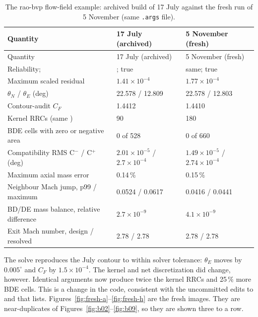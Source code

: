 {\footnotesize
\begin{longtable}{P{6.4cm}P{4.4cm}P{4.4cm}}
\caption{The rao-bvp flow-field example: archived build of 17 July against the fresh run of 5 November (same \texttt{.args} file).}\label{tab:fresh-compare}\\
\toprule
Quantity & 17 July (archived) & 5 November (fresh)\\
\midrule
\endfirsthead
\toprule
Quantity & 17 July (archived) & 5 November (fresh)\\
\midrule
\endhead
\bottomrule
\endfoot
Reliability;  & ; true & same; true\\
Maximum scaled residual & $1.41\times10^{-4}$ & $1.77\times10^{-4}$\\
$\theta_N$ / $\theta_E$ (deg) & 22.578 / 12.809 & 22.578 / 12.803\\
Contour-audit $C_F$ & 1.4412 & 1.4410\\
Kernel RRCs (same  ) & 90 & 180\\
BDE cells with zero or negative area & 0 of 528 & 0 of 660\\
Compatibility RMS C$^-$ / C$^+$ (deg) & $2.01\times10^{-5}$ / $2.7\times10^{-4}$ & $1.49\times10^{-5}$ / $2.74\times10^{-4}$\\
Maximum axial mass error & 0.14\,\% & 0.15\,\%\\
Neighbour Mach jump, p99 / maximum & 0.0524 / 0.0617 & 0.0416 / 0.0441\\
BD/DE mass balance, relative difference & $2.7\times10^{-9}$ & $4.1\times10^{-9}$\\
Exit Mach number, design / resolved & 2.78 / 2.78 & 2.78 / 2.78\\
\end{longtable}
}

The solve reproduces the July contour to within solver tolerance: $\theta_E$ moves by $0.005^\circ$ and $C_F$ by $1.5\times10^{-4}$. The kernel and net discretization did change, however. Identical arguments now produce twice the kernel RRCs and 25\,\% more BDE cells. This is a change in the code, consistent with the uncommitted edits to  and  that   lists. Figures~\ref{fig:fresh-a}--\ref{fig:fresh-h} are the fresh images. They are near-duplicates of Figures~\ref{fig:b02}--\ref{fig:b09}, so they are shown three to a row.


